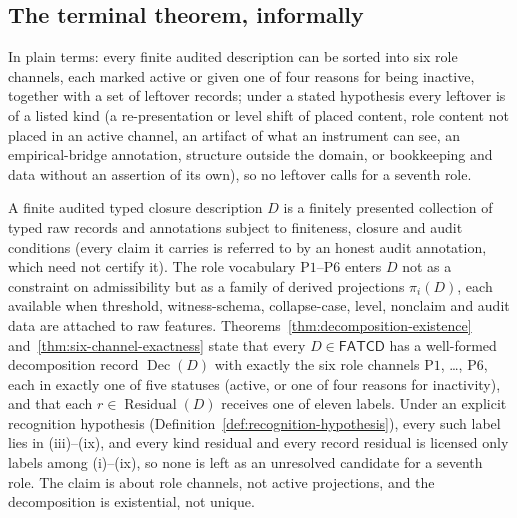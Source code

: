 \documentclass[11pt]{article}
\theoremstyle{definition}
\newcommand{\FATCD}{\ensuremath{\mathsf{FATCD}}}
\newcommand{\Dec}[1]{\ensuremath{\operatorname{Dec}\!\left(#1\right)}}
\newcommand{\Residual}[1]{\ensuremath{\operatorname{Residual}\!\left(#1\right)}}
\newcommand{\Pone}{\ensuremath{\mathrm{P1}}}
\newcommand{\Psix}{\ensuremath{\mathrm{P6}}}
\begin{document}
\subsection{The terminal theorem, informally}\label{subsec:terminal-informal}

In plain terms: every finite audited description can be sorted into six role
channels, each marked active or given one of four reasons for being inactive,
together with a set of leftover records; under a stated hypothesis every
leftover is of a listed kind (a re-presentation or level shift of placed
content, role content not placed in an active channel, an artifact of what an
instrument can see, an empirical-bridge annotation, structure outside the
domain, or bookkeeping and data without an assertion of its own), so no
leftover calls for a seventh role.

A finite audited typed closure description \(D\) is a finitely
presented collection of typed raw records and annotations subject to
finiteness, closure and audit conditions (every claim it carries is referred
to by an honest audit annotation, which need not certify it). The role
vocabulary \Pone{}--\Psix{} enters \(D\) not as a constraint on
admissibility but as a family of derived projections \(\pi_i(D)\),
each available when threshold, witness-schema, collapse-case, level,
nonclaim and audit data are
attached to raw features. Theorems~\ref{thm:decomposition-existence} and~\ref{thm:six-channel-exactness} state that
every \(D \in \FATCD{}\) has a well-formed decomposition record
\(\Dec{D}\) with exactly the six role channels \Pone{}, \ldots, \Psix{},
each in exactly one of five statuses (active, or one of four reasons for
inactivity), and that each \(r\in\Residual{D}\) receives one of eleven labels.
Under an explicit recognition hypothesis
(Definition~\ref{def:recognition-hypothesis}), every such label lies in
(iii)--(ix), and every kind residual and every record residual is licensed only
labels among (i)--(ix), so none is left as an unresolved candidate for a
seventh role. The claim is about role channels, not active projections, and
the decomposition is existential, not unique.
\end{document}
